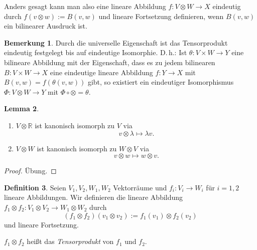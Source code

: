 \documentclass[a4paper]{scrbook}
\numberwithin{equation}{chapter}
\newcommand{\R}{\mathbb{R}}
\theoremstyle{definition}
\newtheorem{defn}{Definition}[section]
\newtheorem{lemma}[defn]{Lemma}
\newtheorem{bem}[defn]{Bemerkung}
\newcommand{\bewUeb}{\begin{proof}Übung.\end{proof}}
\begin{document}
Anders gesagt kann man also eine lineare Abbildung $f\colon V\otimes W\to X$ eindeutig durch $f(v\otimes w) := B(v,w)$ und lineare Fortsetzung definieren, wenn $B(v,w)$ ein bilinearer Ausdruck ist.
\begin{bem}
	Durch die universelle Eigenschaft ist das Tensorprodukt eindeutig festgelegt bis auf eindeutige Isomorphie. D.\,h.: Ist $\theta\colon V\times W\to Y$ eine bilineare Abbildung mit der Eigenschaft, dass es zu jedem bilinearen $B\colon V\times W \to X$ eine eindeutige lineare Abbildung $f\colon Y\to X$ mit $B(v,w) = f(\theta(v,w))$ gibt, so existiert ein eindeutiger Isomorphismus $\Phi\colon V\otimes W\to Y$ mit $\Phi\circ\otimes = \theta$.
\end{bem}
\begin{lemma}
	\begin{enumerate}[label=(\alph*)]
		\item $V\otimes\R$ ist kanonisch isomorph zu $V$ via
		\[v\otimes\lambda \mapsto \lambda v.\]
		\item $V\otimes W$ ist kanonisch isomorph zu $W\otimes V$ via
		\[v\otimes w \mapsto w\otimes v.\]
	\end{enumerate}
	\bewUeb
\end{lemma}

\begin{defn}
	Seien $V_1,V_2, W_1, W_2$ Vektorräume und $f_i\colon V_i \to W_i$ für $i=1,2$ lineare Abbildungen. Wir definieren die lineare Abbildung $f_1\otimes f_2 \colon V_1\otimes V_2 \to W_1\otimes W_2$ durch
	\[(f_1\otimes f_2)(v_1\otimes v_2) := f_1(v_1) \otimes f_2(v_2)\]
	und lineare Fortsetzung.

	$f_1\otimes f_2$ heißt das \emph{Tensorprodukt} von $f_1$ und $f_2$.
\end{defn}
\end{document}
